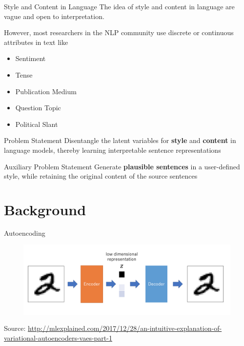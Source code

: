 \documentclass[aspectratio=169]{beamer}
\newcommand{\imgsrc}[1]{\tiny{Source: #1}}
\begin{document}
\begin{frame}{Style and Content in Language}
	The idea of style and content in language are vague and open to interpretation.

	However, most researchers in the NLP community use discrete or continuous attributes in text like
	\begin{itemize}
		\item Sentiment \citep{hu2017toward,shen2017style,fu2017style}
		\item Tense \citep{hu2017toward}
		\item Publication Medium \citep{fu2017style}
		\item Question Topic \citep{kim2017adversarially}
		\item Political Slant \citep{prabhumoye2018style}
	\end{itemize}
\end{frame}

\begin{frame}{Problem Statement}
	\centering
	\Huge{Disentangle the latent variables for \textbf{style} and \textbf{content} in language models, thereby learning interpretable sentence representations}
\end{frame}

\begin{frame}{Auxiliary Problem Statement}
	\centering
	\Huge{Generate \textbf{plausible sentences} in a user-defined style, while retaining the original content of the source sentences}
\end{frame}

% 

\section{Background}

\begin{frame}{Autoencoding}
	\centering
	\begin{figure}[ht]
		\includegraphics[width=\linewidth]{dae-structure}
	\end{figure}
	\imgsrc{\url{http://mlexplained.com/2017/12/28/an-intuitive-explanation-of-variational-autoencoders-vaes-part-1}}
\end{frame}
\end{document}
